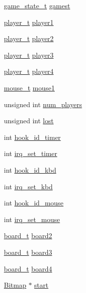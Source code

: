 \begin{DoxyCompactItemize}
\item 
\hyperlink{group___game_ga4edce1ca040716922b6e4a79be4e414d}{game\+\_\+state\+\_\+t} \hyperlink{group___game_gab76fa1d9cbf41273b5a8f7364a9f6f84}{gamest}
\item 
\hyperlink{structplayer__t}{player\+\_\+t} \hyperlink{group___game_ga127cf5952bea43dc134fa5d96bbc0609}{player1}
\item 
\hyperlink{structplayer__t}{player\+\_\+t} \hyperlink{group___game_gaf7e237b4f038b8d3e0deea44ab5d4eff}{player2}
\item 
\hyperlink{structplayer__t}{player\+\_\+t} \hyperlink{group___game_ga92766fdefc43e6eb53ca2792e05fcf51}{player3}
\item 
\hyperlink{structplayer__t}{player\+\_\+t} \hyperlink{group___game_ga11e7b96bbf74ee5e4a0623107518f66f}{player4}
\item 
\hyperlink{structmouse__t}{mouse\+\_\+t} \hyperlink{group___game_gab268f26e6ad9b1b9663004f9f0ea9cd4}{mouse1}
\item 
unsigned int \hyperlink{group___game_ga55cccbeadadd87a8367184083a39377a}{num\+\_\+players}
\item 
unsigned int \hyperlink{group___game_ga6325f05cd0c308b41c677ec0709707a4}{lost}
\item 
int \hyperlink{group___game_ga7f3d11d35385878045b6b6a2ec438ba8}{hook\+\_\+id\+\_\+timer}
\item 
int \hyperlink{group___game_gaadbf3757def1a49b68caa15ef9117b0f}{irq\+\_\+set\+\_\+timer}
\item 
int \hyperlink{group___game_ga7d15e4ad49d56102e73bfb92c6e43a22}{hook\+\_\+id\+\_\+kbd}
\item 
int \hyperlink{group___game_ga492428101cf654ca73d0b290d6dc7dfc}{irq\+\_\+set\+\_\+kbd}
\item 
int \hyperlink{group___game_ga0b0da21bbdff62b7b28e9af7ec3d0d76}{hook\+\_\+id\+\_\+mouse}
\item 
int \hyperlink{group___game_gafd357e4e90c5ce77865791f8e690db27}{irq\+\_\+set\+\_\+mouse}
\item 
\hyperlink{structboard__t}{board\+\_\+t} \hyperlink{group___game_gad024627d28eb323a7677e5a265535816}{board2}
\item 
\hyperlink{structboard__t}{board\+\_\+t} \hyperlink{group___game_gae6800e5869326de6be9d0be65d58b373}{board3}
\item 
\hyperlink{structboard__t}{board\+\_\+t} \hyperlink{group___game_gadb54bfdf7a3bb4d8e2835e93b2de8a09}{board4}
\item 
\hyperlink{struct_bitmap}{Bitmap} $\ast$ \hyperlink{group___game_gad50c72d4974332bda06a2cd6831b2175}{start}

\end{DoxyCompactItemize}
